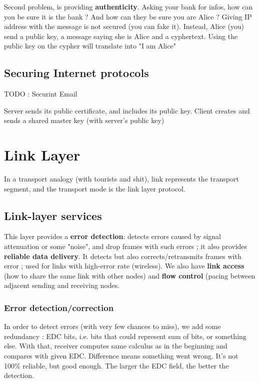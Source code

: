 \documentclass[12pt,a4paper]{article}
\begin{document}
Second problem, is providing \textbf{authenticity}. Asking your bank for infos, how can you be sure it is the bank ? And how can they be sure you are Alice ? Giving IP address with the message is not secured (you can fake it). Instead, Alice (you) send a public key, a message saying she is Alice and a cyphertext. Using the public key on the cypher will translate into "I am Alice"

\subsection{Securing Internet protocols}
TODO : Securint Email

 Server sends its public certificate, and includes its public key. Client creates and sends a shared master key (with server's public key)


\section{Link Layer}
In a transport analogy (with tourists and shit), link represents the transport segment, and the transport mode is the link layer protocol. 

\subsection{Link-layer services}
This layer provides a \textbf{error detection}: detects errors caused by signal attenuation or some "noise", and drop frames with such errors ; it also provides \textbf{reliable data delivery}. It detects but also corrects/retransmits frames with error ; used for links with high-error rate (wireless). We also have \textbf{link access} (how to share the same link with other nodes) and \textbf{flow control} (pacing between adjacent sending and receiving nodes.
\subsubsection{Error detection/correction}
In order to detect errors (with very few chances to miss), we add some redundancy : EDC bits, i.e. bits that could represent sum of bits, or something else. With that, receiver computes same calculus as in the beginning and compares with given EDC. Difference means something went wrong. It's not 100\% reliable, but good enough. The larger the EDC field, the better the detection. 
\end{document}
